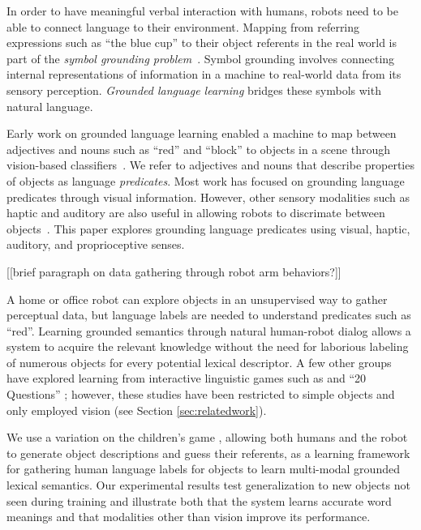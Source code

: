 In order to have meaningful verbal interaction with humans, robots need to be
able to connect language to their environment.  Mapping from referring
expressions such as ``the blue cup'' to their object referents in the real world
is part of the \textit{symbol grounding problem}~\cite{harnad:phys90}.  Symbol
grounding involves connecting internal representations of information in a
machine to real-world data from its sensory perception. \textit{Grounded
language learning} bridges these symbols with natural language.

Early work on grounded language learning enabled a machine to map between adjectives and nouns such as ``red'' and ``block'' to objects in a scene through vision-based classifiers~\cite{roy:evocomm01}.
We refer to adjectives and nouns that describe properties of objects as language \textit{predicates}.
Most work has focused on grounding language predicates through visual information.
However, other sensory modalities such as haptic and auditory are also useful in
allowing robots to discrimate between objects~\cite{sinapov:icra14}. This paper explores grounding language predicates using visual, haptic, auditory, and proprioceptive senses. 

[[brief paragraph on data gathering through robot arm behaviors?]]

A home or office robot can explore objects in an unsupervised way to gather perceptual data, but language labels are needed to understand predicates such as ``red''.
Learning grounded semantics through natural human-robot dialog allows a system to acquire the relevant knowledge without the need for laborious labeling of numerous objects for every potential lexical descriptor.
A few other groups have explored learning from interactive linguistic games such as \ispy and ``20 Questions'' \cite{parde:ijcai15,vogel:aaai10}; however, these studies have been restricted to simple objects and only employed vision (see Section \ref{sec:relatedwork}).

We use a variation on the children's game \ispy, allowing both humans and the
robot to generate object descriptions and guess their referents, as a
learning framework for gathering human language labels for objects to learn
multi-modal grounded lexical semantics.  Our experimental results test
generalization to new objects not seen during training and illustrate both that
the system learns accurate word meanings and that modalities other than vision
improve its performance.
